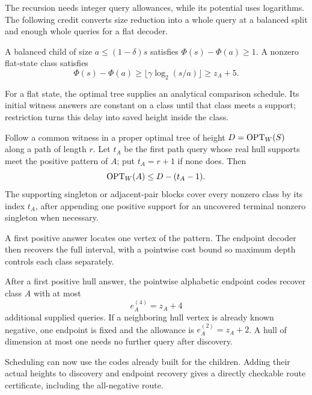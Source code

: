 The recursion needs integer query allowances, while its potential uses
logarithms. The following credit converts size reduction into a whole
query at a balanced split and enough whole queries for a flat decoder.

\begin{proposition}\label{lem:worst-floor-credit}
A balanced child of size $a\le(1-\delta)s$ satisfies
$\Phi(s)-\Phi(a)\ge1$. A nonzero flat-state class satisfies
\begin{equation}\label{eq:worst-floor-credit}
 \Phi(s)-\Phi(a)\ge\lfloor\gamma\log_2(s/a)\rfloor\ge z_A+5.
\end{equation}
\end{proposition}

For a flat state, the optimal tree supplies an analytical comparison
schedule. Its initial witness answers are constant on a class until
that class meets a support; restriction turns this delay into saved
height inside the class.

\begin{proposition}\label{lem:height-prefix}
Follow a common witness in a proper optimal tree of height
$D=\operatorname{OPT}_W(S)$ along a path of length $r$. Let $t_A$ be the first
path query whose real hull supports meet the positive pattern of $A$;
put $t_A=r+1$ if none does. Then
\[
 \operatorname{OPT}_W(A)\le D-(t_A-1).
\]
The supporting singleton or adjacent-pair blocks cover every nonzero
class by its index $t_A$, after appending one positive support for an
uncovered terminal nonzero singleton when necessary.
\end{proposition}

A first positive answer locates one vertex of the pattern. The endpoint
decoder then recovers the full interval, with a pointwise cost bound so
maximum depth controls each class separately.

\begin{proposition}\label{lem:endpoint-height}
After a first positive hull answer, the pointwise alphabetic endpoint
codes recover class $A$ with at most
\[
 e_A^{(4)}=z_A+4
\]
additional supplied queries. If a neighboring hull vertex is already
known negative, one endpoint is fixed and the allowance is
$e_A^{(2)}=z_A+2$. A hull of dimension at most one needs no further
query after discovery.
\end{proposition}

Scheduling can now use the codes already built for the children.
Adding their actual heights to discovery and endpoint recovery gives
a directly checkable route certificate, including the all-negative route.

